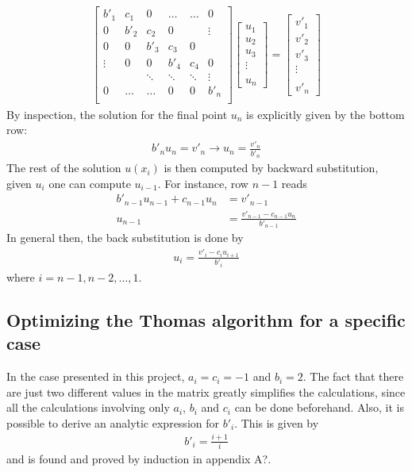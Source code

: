 \documentclass[aps,prl,reprint,toc]{revtex4-1}
\begin{document}
\begin{align*}
  \begin{bmatrix}
    b'_1 & c_1 & 0  & \hdots & \hdots &   0    \\
    0 & b'_2 & c_2 & 0      & &\vdots \\
    0 & 0 & b'_3  & c_3     & 0 &  \\
    \vdots & 0 & 0  & b'_4     & c_4 & 0 \\
    & & \ddots & \ddots & \ddots & \vdots\\
    0 & \hdots  &\hdots & 0 &0 & b'_n \\
  \end{bmatrix}
  \begin{bmatrix}
    u_1 \\ u_2 \\ u_3 \\ \vdots \\ \\ u_n
  \end{bmatrix}
  =
  \begin{bmatrix}
    v'_1 \\ v'_2 \\ v'_3 \\ \vdots \\ \\ v'_n
  \end{bmatrix}
\end{align*}
By inspection, the solution for the final point $u_n$ is explicitly given by the
bottom row:
\begin{align*}
  b'_n u_n = v'_n \rightarrow u_n = \frac{v'_n}{b'_n}
\end{align*}
The rest of the solution $u(x_i)$ is then computed by backward substitution, given
$u_i$ one can compute $u_{i-1}$. For instance, row $n-1$ reads
\begin{align*}
  b'_{n-1} u_{n-1} + c_{n-1} u_n &= v'_{n-1} \\
  u_{n-1} &= \frac{v'_{n-1} - c_{n-1} u_n}{b'_{n-1}}
\end{align*}
In general then, the back substitution is done by
\begin{align*}
  u_i = \frac{v'_i - c_i u_{i+1}}{b'_i}
\end{align*}
where $i = n-1, n-2, \hdots, 1$.
\subsection{Optimizing the Thomas algorithm for a specific case}
In the case presented in this project, $a_i = c_i = -1$ and $b_i = 2$. The fact
that there are just two different values in the matrix greatly simplifies the
calculations, since all the calculations involving only $a_i$, $b_i$ and $c_i$
can be done beforehand. Also, it is possible to derive an analytic expression for
$b'_i$. This is given by
\begin{align*}
  b'_i = \frac{i+1}{i}
\end{align*}
and is found and proved by induction in appendix A?.
\end{document}
